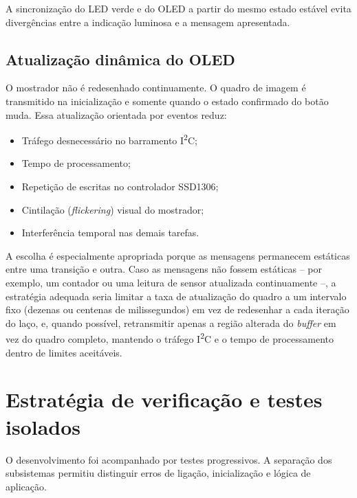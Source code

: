 \documentclass[12pt,a4paper]{article}
\begin{document}
A sincronização do LED verde e do OLED a partir do mesmo estado estável evita divergências entre a indicação luminosa e a mensagem apresentada.

\subsection{Atualização dinâmica do OLED}

O mostrador não é redesenhado continuamente. O quadro de imagem é transmitido na inicialização e somente quando o estado confirmado do botão muda. Essa atualização orientada por eventos reduz:

\begin{itemize}
  \item Tráfego desnecessário no barramento I\textsuperscript{2}C;
  \item Tempo de processamento;
  \item Repetição de escritas no controlador SSD1306;
  \item Cintilação (\textit{flickering}) visual do mostrador;
  \item Interferência temporal nas demais tarefas.
\end{itemize}

A escolha é especialmente apropriada porque as mensagens permanecem estáticas entre uma transição e outra. Caso as mensagens não fossem estáticas -- por exemplo, um contador ou uma leitura de sensor atualizada continuamente --, a estratégia adequada seria limitar a taxa de atualização do quadro a um intervalo fixo (dezenas ou centenas de milissegundos) em vez de redesenhar a cada iteração do laço, e, quando possível, retransmitir apenas a região alterada do \textit{buffer} em vez do quadro completo, mantendo o tráfego I\textsuperscript{2}C e o tempo de processamento dentro de limites aceitáveis.

\section{Estratégia de verificação e testes isolados}

O desenvolvimento foi acompanhado por testes progressivos. A separação dos subsistemas permitiu distinguir erros de ligação, inicialização e lógica de aplicação.
\end{document}
